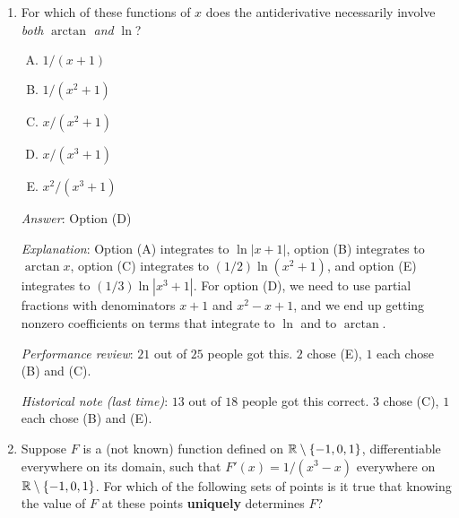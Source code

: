 \documentclass[10pt]{amsart}
\begin{document}
\begin{enumerate}
  {\em Answer}: Option (B)

  {\em Explanation}: For any fixed value of $x \in [1,2]$, the
  integrand $1/\sqrt{x^2 + k}$ is a {\em decreasing} function of $k$
  for $k \in (-1,\infty)$. Hence, the value we get upon integrating it
  for $x \in [1,2]$ should also be a decreasing function of $k$.

  {\em Performance review}: $15$ out of $25$ got this. $6$ chose (D),
  $3$ chose (C), $1$ chose (A).

  {\em Historical note (last time)}: $6$ out of $18$ people got this
  correct. $3$ chose (A), $5$ chose (C), $2$ chose (E), $1$ chose (D),
  $1$ left the question blank.

\item For which of these functions of $x$ does the antiderivative
  necessarily involve {\em both} $\arctan$ {\em and} $\ln$?

  \begin{enumerate}[(A)]
  \item $1/(x + 1)$
  \item $1/(x^2 + 1)$
  \item $x/(x^2 + 1)$
  \item $x/(x^3 + 1)$
  \item $x^2/(x^3 + 1)$
  \end{enumerate}

  {\em Answer}: Option (D)

  {\em Explanation}: Option (A) integrates to $\ln|x + 1|$, option (B)
  integrates to $\arctan x$, option (C) integrates to $(1/2) \ln(x^2 +
  1)$, and option (E) integrates to $(1/3) \ln|x^3 + 1|$. For option
  (D), we need to use partial fractions with denominators $x + 1$ and
  $x^2 - x + 1$, and we end up getting nonzero coefficients on terms
  that integrate to $\ln$ and to $\arctan$.

  {\em Performance review}: $21$ out of $25$ people got this. $2$
  chose (E), $1$ each chose (B) and (C).

  {\em Historical note (last time)}: $13$ out of $18$ people got this
  correct. $3$ chose (C), $1$ each chose (B) and (E).

\item Suppose $F$ is a (not known) function defined on $\mathbb{R} \setminus
  \{ -1,0,1\}$, differentiable everywhere on its domain, such that
  $F'(x) = 1/(x^3 - x)$ everywhere on $\mathbb{R} \setminus \{-1,0,1\}$. For
  which of the following sets of points is it true that knowing the
  value of $F$ at these points {\bf uniquely} determines $F$?


\end{enumerate}
\end{document}
